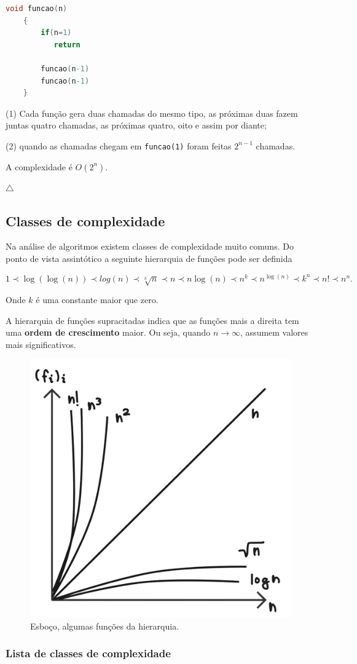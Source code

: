 \begin{lstlisting}[language=C, frame=single]
    void funcao(n)
    {
        if(n=1)
           return

        funcao(n-1)
        funcao(n-1)
    }
\end{lstlisting}

(1) Cada função gera duas chamadas do mesmo tipo, as próximas duas fazem juntas quatro chamadas, as próximas quatro, oito e assim por diante;

(2) quando as chamadas chegam em \texttt{funcao(1)} foram feitas $2^{n-1}$ chamadas.

A complexidade é $O(2^n)$.
 

{\raggedleft $\bigtriangleup$ \par}

\subsection{Classes de complexidade}

Na análise de algoritmos existem classes de complexidade muito comuns. Do ponto de vista assintótico a seguinte hierarquia de funções pode ser definida

\[1\prec \log(\log(n)) \prec log(n) \prec \sqrt[k]{n} \prec n \prec n\log(n) \prec n^k \prec n^{\log(n)} \prec k^n \prec n!\prec n^n.\]

Onde $k$ é uma constante maior que zero.

A hierarquia de funções supracitadas indica que as funções mais a direita tem uma \textbf{ordem de crescimento} maior. Ou seja, quando $n\rightarrow\infty$, assumem valores mais significativos.

\begin{figure}
  \centering
  \includegraphics[width=0.4\linewidth]{img/Classes.png}
    \caption{Esboço, algumas funções da hierarquia.}
    \label{Hierarquia}
\end{figure}

\subsubsection{Lista de classes de complexidade}
\

